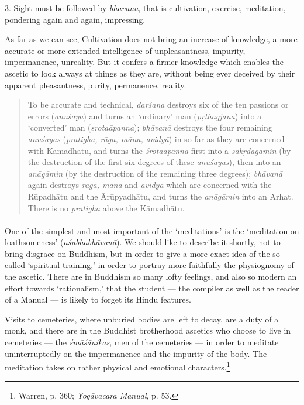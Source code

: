 \documentclass[a4paper, 11pt, oneside, english]{article}
\begin{document}
3. Sight must be followed by \emph{bhāvanā}, that is cultivation, exercise, meditation, pondering again and again, impressing.

As far as we can see, Cultivation does not bring an increase of knowledge, a more accurate or more extended intelligence of unpleasantness, impurity, impermanence, unreality. But it confers a firmer knowledge which enables the ascetic to look always at things as they are, without being ever deceived by their apparent pleasantness, purity, permanence, reality.
\begin{quotation}
\small
To be accurate and technical, \emph{darśana} destroys six of the ten passions or errors (\emph{anuśaya}) and turns an `ordinary' man (\emph{pṛthagjana}) into a `converted' man (\emph{srotaāpanna}); \emph{bhāvanā} destroys the four remaining \emph{anuśayas} (\emph{pratigha, rāga, māna, avidyā}) in so far as they are concerned with Kāmadhātu, and turns the \emph{śrotaāpanna} first into a \emph{sakṛdāgāmin} (by the destruction of the first six degrees of these \emph{anuśayas}), then into an \emph{anāgāmin} (by the destruction of the remaining three degrees); \emph{bhāvanā} again destroys \emph{rāga, māna} and \emph{avidyā} which are concerned with the Rūpadhātu and the Ārūpyadhātu, and turns the \emph{anāgāmin} into an Arhat. There is no \emph{pratigha} above the Kāmadhātu.
\end{quotation}
\paragraph{}
One of the simplest and most important of the `meditations' is the `meditation on loathsomeness' (\emph{aśubhabhāvanā}). We should like to describe it shortly, not to bring disgrace on Buddhism, but in order to give a more exact idea of the so-called `spiritual training,' in order to portray more faithfully the physiognomy of the ascetic. There are in Buddhism so many lofty feelings, and also so modern an effort towards `rationalism,' that the student --- the compiler as well as the reader of a Manual --- is likely to forget its Hindu features.

Visits to cemeteries, where unburied bodies are left to decay, are a duty of a monk, and there are in the Buddhist brotherhood ascetics who choose to live in cemeteries --- the \emph{śmāśānikas}, men of the cemeteries --- in order to meditate uninterruptedly on the impermanence and the impurity of the body. The meditation takes on rather physical and emotional characters.\footnote{Warren, p. 360; \emph{Yogāvacara Manual}, p. 53.}
\end{document}
